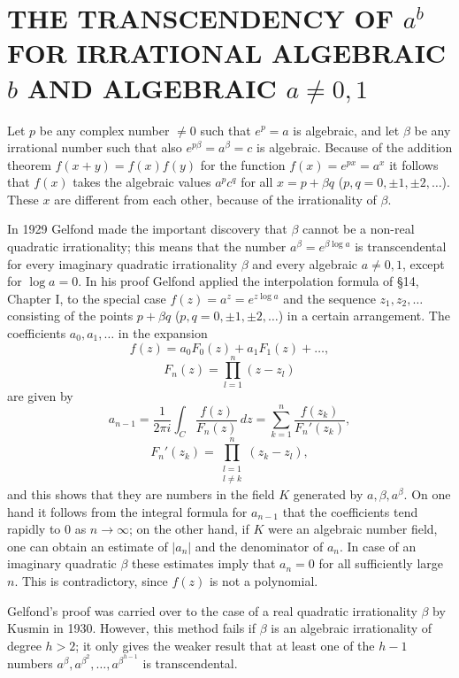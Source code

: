 \chapter{THE TRANSCENDENCY OF $a^b$ FOR IRRATIONAL ALGEBRAIC $b$ AND ALGEBRAIC $a \neq 0, 1$}

Let $p$ be any complex number $\neq 0$ such that $e^p = a$ is algebraic, and let $\beta$ be any irrational number such that also $e^{p\beta} = a^\beta = c$ is algebraic. Because of the addition theorem $f(x+y) = f(x)f(y)$ for the function $f(x) = e^{px} = a^x$ it follows that $f(x)$ takes the algebraic values $a^p c^q$ for all $x = p + \beta q$ ($p, q = 0, \pm 1, \pm 2, \dots$). These $x$ are different from each other, because of the irrationality of $\beta$.

In 1929 Gelfond made the important discovery that $\beta$ cannot be a non-real quadratic irrationality; this means that the number $a^\beta = e^{\beta \log a}$ is transcendental for every imaginary quadratic irrationality $\beta$ and every algebraic $a \neq 0, 1$, except for $\log a = 0$. In his proof Gelfond applied the interpolation formula of \S 14, Chapter I, to the special case $f(z) = a^z = e^{z \log a}$ and the sequence $z_1, z_2, \dots$ consisting of the points $p + \beta q$ ($p, q = 0, \pm 1, \pm 2, \dots$) in a certain arrangement. The coefficients $a_0, a_1, \dots$ in the expansion
\[
f(z) = a_{0}F_{0}(z) + a_{1}F_{1}(z) + \dots,
\]
\[
F_{n}(z) = \prod_{l=1}^{n} (z-z_{l})
\]
are given by
\[
a_{n-1} = \frac{1}{2\pi i} \int_{C} \frac{f(z)}{F_{n}(z)} \, dz = \sum_{k=1}^{n} \frac{f(z_{k})}{F_{n}'(z_{k})},
\]
\[
F_{n}'(z_{k}) = \prod_{\substack{l=1\\l \neq k}}^{n} (z_{k} - z_{l}),
\]
and this shows that they are numbers in the field $K$ generated by $a, \beta, a^\beta$. On one hand it follows from the integral formula for $a_{n-1}$ that the coefficients tend rapidly to $0$ as $n \to \infty$; on the other hand, if $K$ were an algebraic number field, one can obtain an estimate of $|a_n|$ and the denominator of $a_n$. In case of an imaginary quadratic $\beta$ these estimates imply that $a_n = 0$ for all sufficiently large $n$. This is contradictory, since $f(z)$ is not a polynomial.

Gelfond's proof was carried over to the case of a real quadratic irrationality $\beta$ by Kusmin in 1930. However, this method fails if $\beta$ is an algebraic irrationality of degree $h > 2$; it only gives the weaker result that at least one of the $h-1$ numbers $a^\beta, a^{\beta^2}, \dots, a^{\beta^{h-1}}$ is transcendental.

